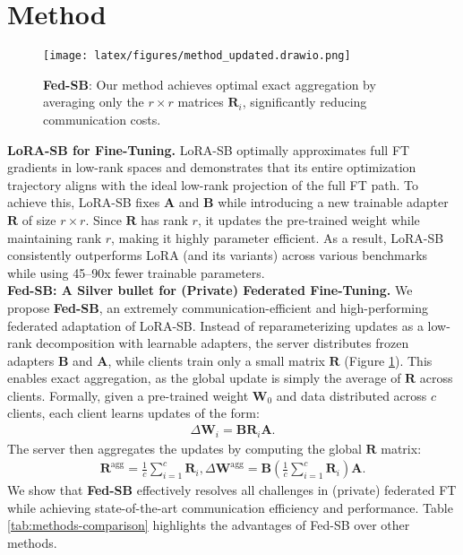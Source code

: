 
\section{Method}\label{sec:method}

\begin{figure}
    \centering
    \texttt{[image: latex/figures/method\_updated.drawio.png]}
    \caption{\textbf{Fed-SB}: Our method achieves optimal exact aggregation by averaging only the \( r\times r\) matrices \( \mathbf{R}_i \), significantly reducing communication costs.}
    \label{fig:method}
\end{figure}

\quad \textbf{LoRA-SB for Fine-Tuning.}
LoRA-SB \citep{ponkshe2024initialization} optimally approximates full FT gradients in low-rank spaces and demonstrates that its entire optimization trajectory aligns with the ideal low-rank projection of the full FT path. 
To achieve this, LoRA-SB fixes \( \mathbf{A} \) and \( \mathbf{B} \) while introducing a new trainable adapter \( \mathbf{R} \) of size \( r \times r \).  
Since \( \mathbf{R} \) has rank \( r \), it updates the pre-trained weight while maintaining rank \( r \), making it highly parameter efficient.  
As a result, LoRA-SB consistently outperforms LoRA (and its variants) across various benchmarks while using 45–90x fewer trainable parameters.
\\

\textbf{Fed-SB: A Silver bullet for (Private) Federated Fine-Tuning.} 
We propose \textbf{Fed-SB}, an extremely communication-efficient and high-performing federated adaptation of LoRA-SB. 
Instead of reparameterizing updates as a low-rank decomposition with learnable adapters, the server distributes frozen adapters \( \mathbf{B} \) and \( \mathbf{A} \), while clients train only a small matrix \( \mathbf{R} \) (Figure \ref{fig:method}). 
This enables exact aggregation, as the global update is simply the average of \( \mathbf{R} \) across clients.  
Formally, given a pre-trained weight \( \mathbf{W}_0 \) and data distributed across \( c \) clients, each client learns updates of the form:  
\begin{align}
    \Delta \mathbf{W}_i = \mathbf{B} \mathbf{R}_i \mathbf{A}.
\end{align}
The server then aggregates the updates by computing the global \( \mathbf{R} \) matrix:  
\begin{align}
    \mathbf{R}^{\text{agg}} = \frac{1}{c} \sum_{i=1}^{c} \mathbf{R}_i,
    \Delta \mathbf{W}^{\text{agg}} = \mathbf{B} \left(\frac{1}{c} \sum_{i=1}^{c} \mathbf{R}_i \right) \mathbf{A}.
\end{align}
We show that \textbf{Fed-SB} effectively resolves all challenges in (private) federated FT while achieving state-of-the-art communication efficiency and performance. 
Table \ref{tab:methods-comparison} highlights the advantages of Fed-SB over other methods.
\\

